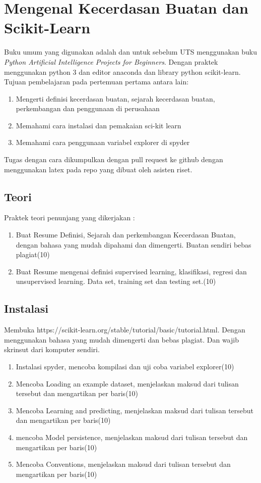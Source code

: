 \chapter{Mengenal Kecerdasan Buatan dan Scikit-Learn}
Buku umum yang digunakan adalah \cite{russell2016artificial} dan  
untuk sebelum UTS menggunakan buku \textit{Python Artificial Intelligence Projects for Beginners}\cite{eckroth2018python}.
Dengan praktek menggunakan python 3 dan editor anaconda dan library python scikit-learn.
Tujuan pembelajaran pada pertemuan pertama antara lain:
\begin{enumerate}
\item
Mengerti definisi kecerdasan buatan, sejarah kecerdasan buatan, perkembangan dan penggunaan di perusahaan
\item
Memahami cara instalasi dan pemakaian sci-kit learn
\item
Memahami cara penggunaan variabel explorer di spyder
\end{enumerate}
Tugas dengan cara dikumpulkan dengan pull request ke github dengan menggunakan latex pada repo yang dibuat oleh asisten riset.

\section{Teori}
Praktek teori penunjang yang dikerjakan :
\begin{enumerate}
\item
Buat Resume Definisi, Sejarah dan perkembangan Kecerdasan Buatan, dengan bahasa yang mudah dipahami dan dimengerti. Buatan sendiri bebas plagiat(10)
\item
Buat Resume mengenai definisi supervised learning, klasifikasi, regresi dan unsupervised learning. Data set, training set dan testing set.(10)
\end{enumerate}

\section{Instalasi}
Membuka https://scikit-learn.org/stable/tutorial/basic/tutorial.html. Dengan menggunakan bahasa yang mudah dimengerti dan bebas plagiat. 
Dan wajib skrinsut dari komputer sendiri.
\begin{enumerate}
\item
Instalasi spyder, mencoba kompilasi dan uji coba variabel explorer(10)
\item
Mencoba Loading an example dataset, menjelaskan maksud dari tulisan tersebut dan mengartikan per baris(10)
\item
Mencoba Learning and predicting, menjelaskan maksud dari tulisan tersebut dan mengartikan per baris(10)
\item
mencoba Model persistence, menjelaskan maksud dari tulisan tersebut dan mengartikan per baris(10)
\item 
Mencoba Conventions, menjelaskan maksud dari tulisan tersebut dan mengartikan per baris(10)
\end{enumerate}


